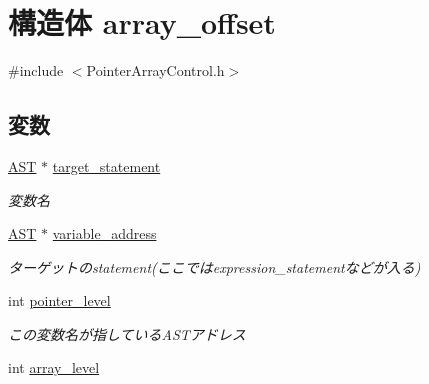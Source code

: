 \hypertarget{structarray__offset}{
\section{構造体 array\_\-offset}
\label{structarray__offset}
}


{\ttfamily \#include $<$PointerArrayControl.h$>$}

\subsection*{変数}
\begin{DoxyCompactItemize}
\item 
\hypertarget{structarray__offset_afd077f3bd6710cff01a7b45ed165bde2}{
\hyperlink{structabstract__syntax__tree}{AST} $\ast$ \hyperlink{structarray__offset_afd077f3bd6710cff01a7b45ed165bde2}{target\_\-statement}}
\label{structarray__offset_afd077f3bd6710cff01a7b45ed165bde2}

\begin{DoxyCompactList}\small\item\em 変数名 \item\end{DoxyCompactList}\item 
\hypertarget{structarray__offset_af1c0654e42cb4c87213a76c1a5ed1b49}{
\hyperlink{structabstract__syntax__tree}{AST} $\ast$ \hyperlink{structarray__offset_af1c0654e42cb4c87213a76c1a5ed1b49}{variable\_\-address}}
\label{structarray__offset_af1c0654e42cb4c87213a76c1a5ed1b49}

\begin{DoxyCompactList}\small\item\em ターゲットのstatement(ここではexpression\_\-statementなどが入る) \item\end{DoxyCompactList}\item 
\hypertarget{structarray__offset_acdec5a49acb00313d5f2639a8d65a19e}{
int \hyperlink{structarray__offset_acdec5a49acb00313d5f2639a8d65a19e}{pointer\_\-level}}
\label{structarray__offset_acdec5a49acb00313d5f2639a8d65a19e}

\begin{DoxyCompactList}\small\item\em この変数名が指しているASTアドレス \item\end{DoxyCompactList}\item 
\hypertarget{structarray__offset_a7b52678b7dd18aee856cea8a4d33c31b}{
int \hyperlink{structarray__offset_a7b52678b7dd18aee856cea8a4d33c31b}{array\_\-level}}
\label{structarray__offset_a7b52678b7dd18aee856cea8a4d33c31b}


\end{DoxyCompactItemize}
